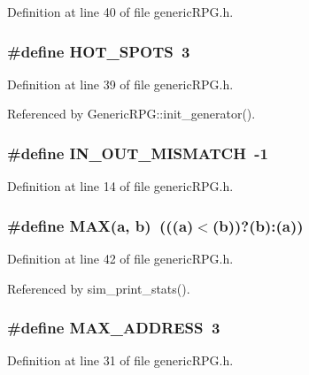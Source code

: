 Definition at line 40 of file genericRPG.h.
\subsubsection[{HOT\_\-SPOTS}]{\setlength{\rightskip}{0pt plus 5cm}\#define HOT\_\-SPOTS~3}\label{genericRPG_8h_416a5068ad5649b1fb0c4dc41d6616ff}




Definition at line 39 of file genericRPG.h.

Referenced by GenericRPG::init\_\-generator().
\subsubsection[{IN\_\-OUT\_\-MISMATCH}]{\setlength{\rightskip}{0pt plus 5cm}\#define IN\_\-OUT\_\-MISMATCH~-1}\label{genericRPG_8h_acf2b8af3c21da41c625361742b49033}




Definition at line 14 of file genericRPG.h.
\subsubsection[{MAX}]{\setlength{\rightskip}{0pt plus 5cm}\#define MAX(a, \/  b)~(((a)$<$(b))?(b):(a))}\label{genericRPG_8h_fa99ec4acc4ecb2dc3c2d05da15d0e3f}




Definition at line 42 of file genericRPG.h.

Referenced by sim\_\-print\_\-stats().
\subsubsection[{MAX\_\-ADDRESS}]{\setlength{\rightskip}{0pt plus 5cm}\#define MAX\_\-ADDRESS~3}\label{genericRPG_8h_aba07841c3e227bc8bdd8ccdad149349}




Definition at line 31 of file genericRPG.h.
